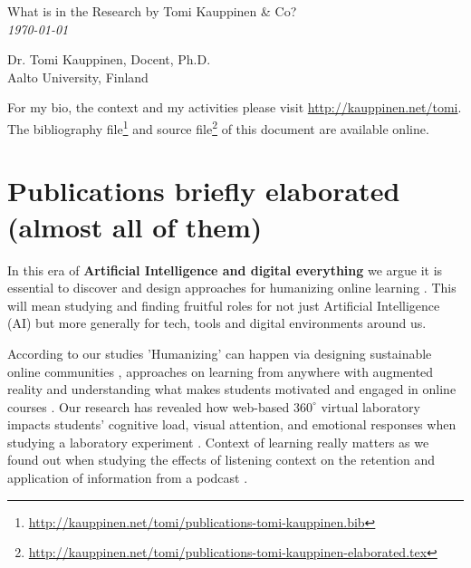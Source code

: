 \documentclass[11pt,letterpaper]{article}
\def\name{What is in the Research by Tomi Kauppinen \& Co?\\ \small{\textit{\today}}}
\begin{document}
{\huge \name}


\vspace{0.25in}

\begin{minipage}[t]{0.5\textwidth}
Dr. Tomi Kauppinen, Docent, Ph.D.\\
Aalto University, Finland \\

  \normalsize


\end{minipage}
\begin{minipage}[t]{0.5\textwidth}

\end{minipage}

\small For my bio, the context and my activities please visit
\url{http://kauppinen.net/tomi}.
The bibliography file\footnote{\url{http://kauppinen.net/tomi/publications-tomi-kauppinen.bib}}
and source
file\footnote{\url{http://kauppinen.net/tomi/publications-tomi-kauppinen-elaborated.tex}}
of this document are available online. 

\normalsize

\section*{Publications briefly elaborated (almost all of them)}


In this era of \textbf{Artificial Intelligence and digital everything} we argue it is essential to discover and design approaches for humanizing online learning \cite{humanizing-2024}. This will mean studying and finding fruitful roles for not just Artificial Intelligence (AI) but more generally for tech, tools and digital environments around us. 

According to our studies 'Humanizing' can happen via designing sustainable online communities \cite{design-community-2024}, approaches on learning from anywhere with augmented reality \cite{CPLJ-AR-2024,learn-anywhere-ar-2024} and understanding what makes students motivated and engaged in online courses \cite{students-engagement-2024}. Our research has revealed how web-based $360^\circ$ virtual laboratory impacts students' cognitive load, visual attention, and emotional responses when studying a laboratory experiment \cite{virtual-lab-2026}. Context of learning really matters as we found out when studying the effects of listening context on the retention and application of information from a podcast \cite{podcast-retention-2024}. 
\end{document}
